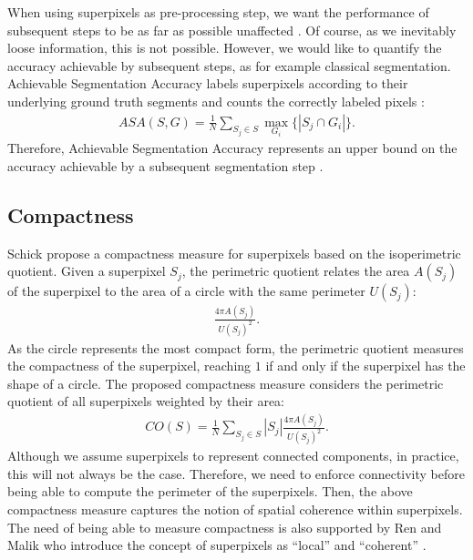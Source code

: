 When using superpixels as pre-processing step, we want the performance of subsequent steps to be as far as possible unaffected \cite{LiuTuzelRamalingamChellappa:2011}. Of course, as we inevitably loose information, this is not possible. However, we would like to quantify the accuracy achievable by subsequent steps, as for example classical segmentation. Achievable Segmentation Accuracy labels superpixels according to their underlying ground truth segments and counts the correctly labeled pixels \cite{LiuTuzelRamalingamChellappa:2011}:
\begin{align}
	ASA(S, G) = \frac{1}{N} \sum_{S_j \in S} \max_{G_i} \{|S_j \cap G_i|\}.
\end{align}
Therefore, Achievable Segmentation Accuracy represents an upper bound on the accuracy achievable by a subsequent segmentation step \cite{LiuTuzelRamalingamChellappa:2011}.

\subsection{Compactness}
\label{subsection:datasets-extended-berkeley-segmentation-benchmark-compactness}

Schick \etal \cite{SchickFischerStiefelhagen:2012} propose a compactness measure for superpixels based on the isoperimetric quotient. Given a superpixel $S_j$, the perimetric quotient relates the area $A(S_j)$ of the superpixel to the area of a circle with the same perimeter $U(S_j)$:
\begin{align}
	\frac{4\pi A(S_j)}{U(S_j)^2}.
\end{align}
As the circle represents the most compact form, the perimetric quotient measures the compactness of the superpixel, reaching $1$ if and only if the superpixel has the shape of a circle. The proposed compactness measure considers the perimetric quotient of all superpixels weighted by their area:
\begin{align}
	CO(S) = \frac{1}{N} \sum_{S_j \in S} |S_j| \frac{4 \pi A(S_j)}{U(S_j)^2}.
\end{align}
Although we assume superpixels to represent connected components, in practice, this will not always be the case. Therefore, we need to enforce connectivity before being able to compute the perimeter of the superpixels. Then, the above compactness measure captures the notion of spatial coherence within superpixels. The need of being able to measure compactness is also supported by Ren and Malik who introduce the concept of superpixels as ``local'' and ``coherent'' \cite{RenMalik:2003}.

